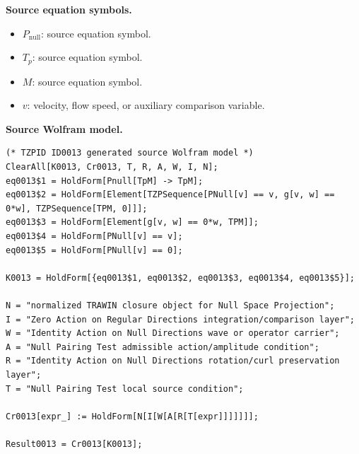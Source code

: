 \begin{minipage}[t]{0.49\linewidth}
\begingroup
\small
\raggedright
\textbf{Source equation symbols.}\par
\begin{itemize}[leftmargin=1.35em,itemsep=1pt,topsep=1pt,parsep=0pt]
    \item $P_{\mathrm{null}}$: source equation symbol.
    \item $T_{p}$: source equation symbol.
    \item $M$: source equation symbol.
    \item $v$: velocity, flow speed, or auxiliary comparison variable.
\end{itemize}
\endgroup
\end{minipage}\hfill
\begin{minipage}[t]{0.47\linewidth}
\begingroup
\scriptsize
\raggedright
\textbf{Source Wolfram model.}\par
\begin{Verbatim}[fontsize=\tiny,breaklines=true,breakanywhere=true]
(* TZPID ID0013 generated source Wolfram model *)
ClearAll[K0013, Cr0013, T, R, A, W, I, N];
eq0013$1 = HoldForm[Pnull[TpM] -> TpM];
eq0013$2 = HoldForm[Element[TZPSequence[PNull[v] == v, g[v, w] == 0*w], TZPSequence[TPM, 0]]];
eq0013$3 = HoldForm[Element[g[v, w] == 0*w, TPM]];
eq0013$4 = HoldForm[PNull[v] == v];
eq0013$5 = HoldForm[PNull[v] == 0];

K0013 = HoldForm[{eq0013$1, eq0013$2, eq0013$3, eq0013$4, eq0013$5}];

N = "normalized TRAWIN closure object for Null Space Projection";
I = "Zero Action on Regular Directions integration/comparison layer";
W = "Identity Action on Null Directions wave or operator carrier";
A = "Null Pairing Test admissible action/amplitude condition";
R = "Identity Action on Null Directions rotation/curl preservation layer";
T = "Null Pairing Test local source condition";

Cr0013[expr_] := HoldForm[N[I[W[A[R[T[expr]]]]]]];

Result0013 = Cr0013[K0013];
\end{Verbatim}
\endgroup
\end{minipage}

